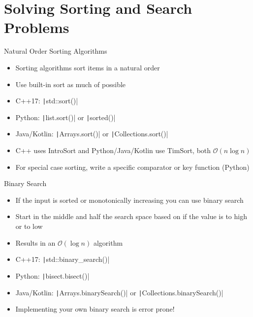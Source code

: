 \documentclass[11pt,pdf, aspectratio=169]{beamer}
\begin{document}
  \section{Solving Sorting and Search Problems}
  \begin{frame}{Natural Order Sorting Algorithms}
    \begin{itemize}
      \item Sorting algorithms sort items in a natural order
      \item Use built-in sort as much of possible
      \item C++17: \texttt|std::sort()|
      \item Python: \texttt|list.sort()| or \texttt|sorted()|
      \item Java/Kotlin: \texttt|Arrays.sort()| or \texttt|Collections.sort()|
      \item C++ uses IntroSort and Python/Java/Kotlin use TimSort, both $\mathcal{O}(n\log{}n)$
      \item For special case sorting, write a specific comparator or key function (Python)
    \end{itemize}
  \end{frame}
  \begin{frame}{Binary Search}
    \begin{itemize}
      \item If the input is sorted or monotonically increasing you can use binary search
      \item Start in the middle and half the search space based on if the value is to high or to low
      \item Results in an $\mathcal{O}(\log{}n)$ algorithm
      \item C++17: \texttt|std::binary_search()|
      \item Python: \texttt|bisect.bisect()|
      \item Java/Kotlin: \texttt|Arrays.binarySearch()| or \texttt|Collections.binarySearch()|
      \item Implementing your own binary search is error prone!
    \end{itemize}
  \end{frame}
\end{document}
